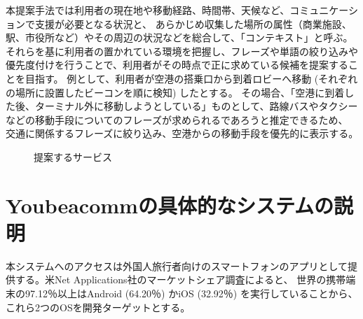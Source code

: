 \documentclass[11pt,papersize]{jsbook}
\begin{document}
本提案手法では利用者の現在地や移動経路、時間帯、天候など、コミュニケーションで支援が必要となる状況と、
あらかじめ収集した場所の属性（商業施設、駅、市役所など）やその周辺の状況などを総合して、「コンテキスト」と呼ぶ。
それらを基に利用者の置かれている環境を把握し、フレーズや単語の絞り込みや優先度付けを行うことで、利用者がその時点で正に求めている候補を提案することを目指す。
例として、利用者が空港の搭乗口から到着ロビーへ移動 (それぞれの場所に設置したビーコンを順に検知) したとする。
その場合、「空港に到着した後、ターミナル外に移動しようとしている」ものとして、路線バスやタクシーなどの移動手段についてのフレーズが求められるであろうと推定できるため、
交通に関係するフレーズに絞り込み、空港からの移動手段を優先的に表示する。
\begin{figure}[htbp]
 \begin{center}
 \end{center}
 \caption{提案するサービス}
 \label{fig:use_flow}
\end{figure}

\section{Youbeacommの具体的なシステムの説明}
 本システムへのアクセスは外国人旅行者向けのスマートフォンのアプリとして提供する。米Net Applications社のマーケットシェア調査\cite{b}によると、
世界の携帯端末の97.12％以上はAndroid (64.20％) かiOS (32.92％) を実行していることから、これら2つのOSを開発ターゲットとする。
\end{document}
